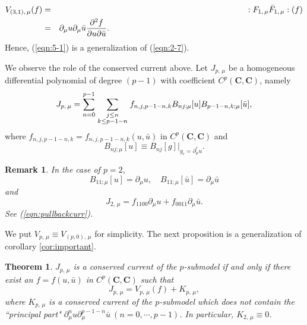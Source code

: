 \documentclass[makeidx,12pt,openany]{report}
\newtheorem{thm}[df]{Theorem}
\newtheorem{rmk}[df]{Remark}
\begin{document}
\begin{eqnarray}
 V_{(3,1),\, \mu}(f) &=& :F_{1,\, \mu}\bar{F}_{1,\, \mu}:(f) \nonumber \\
   &=& \partial_{\mu}u \partial_{\mu}\bar{u} 
        \frac{\partial^2 f}{\partial u \partial \bar{u}}.
      \hspace{83mm}
\end{eqnarray}
Hence, (\ref{eqn:5-1}) is a generalization of (\ref{eqn:2-7}).

We observe the role of the conserved current above. 
Let $J_{p,\, \mu}$ be a homogeneous differential polynomial 
of degree $(p-1)$ with coefficient $C^p({\mathbf{C}},{\mathbf{C}})$, 
namely 
\begin{equation}
 J_{p,\, \mu}=\sum_{n=0}^{p-1} 
  \sum_{{\scriptstyle j \le n}\atop{\scriptstyle k \le p-1-n}}
  f_{n,j,p-1-n,k} B_{nj;\mu}[u] B_{p-1-n,k;\mu}[\bar{u}], 
\end{equation}
where $f_{n,j,p-1-n,k}=f_{n,j,p-1-n,k}(u,\bar{u})$ in 
$C^p({\mathbf{C}},{\mathbf{C}})$ and 
$$
 B_{nj;\mu}[u] \equiv B_{nj}[g]|_{g_r=\partial_{\mu}^r u}. 
$$
\begin{rmk}
In the case of $p=2$, 
$$
B_{11;\mu}[u]=\partial_{\mu}u, \quad 
B_{11;\mu}[\bar{u}]=\partial_{\mu}\bar{u}
$$
and 
$$
J_{2,\, \mu}=f_{1100}\partial_{\mu}u+f_{0011}\partial_{\mu}\bar{u}. 
$$
See (\ref{eqn:pullbackcurr}). 
\end{rmk}
We put $V_{p,\, \mu} \equiv V_{(p,0),\, \mu}$ for simplicity. 
The next proposition is a generalization of corollary \ref{cor:important}. 
\begin{thm}\label{thm:abc-method}
$J_{p,\, \mu}$ is a conserved current of the $p$-submodel if and only if 
there exist an $f=f(u,\bar{u})$ in $C^p({\mathbf{C}},{\mathbf{C}})$ such that 
\begin{equation}
J_{p,\, \mu}=V_{p,\, \mu}(f)+K_{p,\, \mu}, 
\end{equation}
where $K_{p,\, \mu}$ is a conserved current of the $p$-submodel 
which does not contain the ``principal part" 
$\partial_{\mu}^n u \partial_{\mu}^{p-1-n} \bar{u} \ (n=0,\cdots,p-1)$. 
In particular, $K_{2,\, \mu} \equiv 0$. 
\end{thm}
\end{document}
